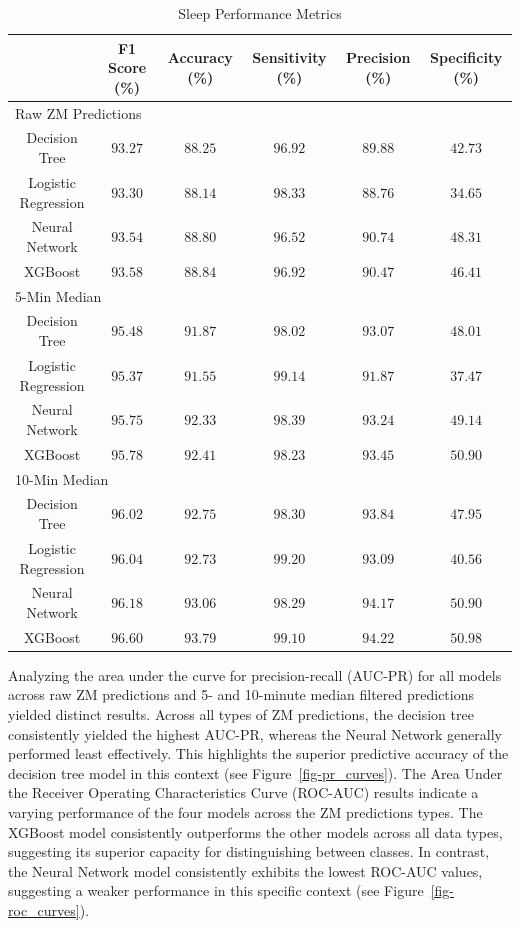 \documentclass[
  super,
  preprint,
  3p]{elsarticle}
\begin{document}
\hypertarget{tbl-sleep_performance}{}
\begin{longtable}{cccccc}
\caption{\label{tbl-sleep_performance}Sleep Performance Metrics }\tabularnewline

\toprule
 & F1 Score (\%) & Accuracy (\%) & Sensitivity (\%) & Precision (\%) & Specificity (\%) \\ 
\midrule
\multicolumn{6}{l}{Raw ZM Predictions} \\ 
\midrule
Decision Tree & $93.27$ & $88.25$ & $96.92$ & $89.88$ & $42.73$ \\ 
Logistic Regression & $93.30$ & $88.14$ & $98.33$ & $88.76$ & $34.65$ \\ 
Neural Network & $93.54$ & $88.80$ & $96.52$ & $90.74$ & $48.31$ \\ 
XGBoost & $93.58$ & $88.84$ & $96.92$ & $90.47$ & $46.41$ \\ 
\midrule
\multicolumn{6}{l}{5-Min Median} \\ 
\midrule
Decision Tree & $95.48$ & $91.87$ & $98.02$ & $93.07$ & $48.01$ \\ 
Logistic Regression & $95.37$ & $91.55$ & $99.14$ & $91.87$ & $37.47$ \\ 
Neural Network & $95.75$ & $92.33$ & $98.39$ & $93.24$ & $49.14$ \\ 
XGBoost & $95.78$ & $92.41$ & $98.23$ & $93.45$ & $50.90$ \\ 
\midrule
\multicolumn{6}{l}{10-Min Median} \\ 
\midrule
Decision Tree & $96.02$ & $92.75$ & $98.30$ & $93.84$ & $47.95$ \\ 
Logistic Regression & $96.04$ & $92.73$ & $99.20$ & $93.09$ & $40.56$ \\ 
Neural Network & $96.18$ & $93.06$ & $98.29$ & $94.17$ & $50.90$ \\ 
XGBoost & $96.60$ & $93.79$ & $99.10$ & $94.22$ & $50.98$ \\ 
\bottomrule
\end{longtable}

Analyzing the area under the curve for precision-recall (AUC-PR) for all
models across raw ZM predictions and 5- and 10-minute median filtered
predictions yielded distinct results. Across all types of ZM
predictions, the decision tree consistently yielded the highest AUC-PR,
whereas the Neural Network generally performed least effectively. This
highlights the superior predictive accuracy of the decision tree model
in this context (see Figure~\ref{fig-pr_curves}). The Area Under the
Receiver Operating Characteristics Curve (ROC-AUC) results indicate a
varying performance of the four models across the ZM predictions types.
The XGBoost model consistently outperforms the other models across all
data types, suggesting its superior capacity for distinguishing between
classes. In contrast, the Neural Network model consistently exhibits the
lowest ROC-AUC values, suggesting a weaker performance in this specific
context (see Figure~\ref{fig-roc_curves}).
\end{document}
